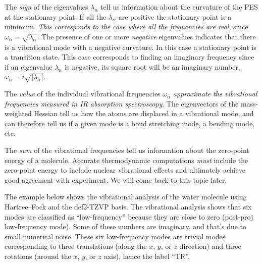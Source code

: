 \documentclass[../Main/chem371-notes.tex]{subfiles}
\begin{document}
\begin{myitems}
\item The \emph{sign} of the eigenvalues $\lambda_\alpha$ tell us information about the curvature of the PES at the stationary point.
If all the $\lambda_\alpha$ are positive the stationary point is a minimum. \emph{This corresponds to the case where all the frequencies are real}, since $\omega_\alpha = \sqrt{\lambda_\alpha}$.
The presence of one or more \emph{negative} eigenvalues indicates that there is a vibrational mode with a negative curvature.
In this case a stationary point is a transition state.
This case corresponds to finding an imaginary frequency since if an eigenvalue $\lambda_\alpha$ is negative, its square root will be an imaginary number, $\omega_\alpha = i \sqrt{|\lambda_\alpha|}$.

\item The \emph{value} of the individual vibrational frequencies $\omega_\alpha$ \emph{approximate the vibrational frequencies measured in IR absorption spectroscopy}.
The eigenvectors of the mass-weighted Hessian tell us how the atoms are displaced in a vibrational mode, and can therefore tell us if a given mode is a bond stretching mode, a bending mode, etc.

\item The \emph{sum} of the vibrational frequencies tell us information about the zero-point energy of a molecule.
Accurate thermodynamic computations \emph{must} include the zero-point energy to include nuclear vibrational effects and ultimately achieve good agreement with experiment. We will come back to this topic later.
\end{myitems}

The example below shows the vibrational analysis of the water molecule using Hartree--Fock and the def2-TZVP basis.
The vibrational analysis shows that six modes are classified as ``low-frequency'' because they are close to zero (post-proj low-frequency mode).
Some of these numbers are imaginary, and that's due to small numerical noise.
These six low-frequency modes are trivial modes corresponding to three translations (along the $x$, $y$, or $z$ direction) and three rotations (around the $x$, $y$, or $z$ axis), hence the label ``TR''.
\end{document}
